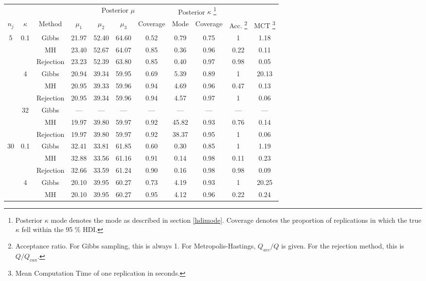 {\footnotesize
\begin{tabular}{ccccccccccc}
  \toprule 
 &&& \multicolumn{4}{c}{Posterior $\mu$} & \multicolumn{2}{c}{Posterior $\kappa$ \footnote{Posterior $\kappa$ mode denotes the mode as described in section \ref{hdimode}. Coverage denotes the proportion of replications in which the true $\kappa$ fell within the 95 \% HDI.} }&  \\
   $n_j$ & $\kappa$ & Method & $\mu_1$ & $\mu_2$ & $\mu_3$ & Coverage & Mode & Coverage & Acc. \footnote{Acceptance ratio. For Gibbs sampling, this is always 1. For Metropolis-Hastings, $Q_{acc}/Q$ is given. For the rejection method, this is $Q/Q_{can}$.} & MCT \footnote{Mean Computation Time of one replication in seconds.} \\
 \midrule 
 5 & 0.1 & Gibbs & 21.97 & 52.40 & 64.60 & 0.52 & 0.79 & 0.75 & 1 & 1.18 \\ 
   &  & MH & 23.40 & 52.67 & 64.07 & 0.85 & 0.36 & 0.96 & 0.22 & 0.11 \\ 
   \vspace{0.2cm} &  & Rejection & 23.23 & 52.39 & 63.80 & 0.85 & 0.40 & 0.97 & 0.98 & 0.05 \\ 
   & 4 & Gibbs & 20.94 & 39.34 & 59.95 & 0.69 & 5.39 & 0.89 & 1 & 20.13 \\ 
   &  & MH & 20.95 & 39.33 & 59.96 & 0.94 & 4.69 & 0.96 & 0.47 & 0.13 \\ 
   \vspace{0.2cm} &  & Rejection & 20.95 & 39.34 & 59.96 & 0.94 & 4.57 & 0.97 & 1 & 0.06 \\ 
   & 32 & Gibbs & --- & --- & --- & --- & --- & --- & --- & --- \\ 
   &  & MH & 19.97 & 39.80 & 59.97 & 0.92 & 45.82 & 0.93 & 0.76 & 0.14 \\ 
   &  & Rejection & 19.97 & 39.80 & 59.97 & 0.92 & 38.37 & 0.95 & 1 & 0.06 \\ 
   \cmidrule{1-11} 
 30 & 0.1 & Gibbs & 32.41 & 33.81 & 61.85 & 0.60 & 0.30 & 0.85 & 1 & 1.19 \\ 
   &  & MH & 32.88 & 33.56 & 61.16 & 0.91 & 0.14 & 0.98 & 0.11 & 0.23 \\ 
   \vspace{0.2cm} &  & Rejection & 32.66 & 33.59 & 61.24 & 0.90 & 0.16 & 0.98 & 0.98 & 0.09 \\ 
   & 4 & Gibbs & 20.10 & 39.95 & 60.27 & 0.73 & 4.19 & 0.93 & 1 & 20.25 \\ 
   &  & MH & 20.10 & 39.95 & 60.27 & 0.95 & 4.12 & 0.96 & 0.22 & 0.24 \\ 

\end{tabular}}

